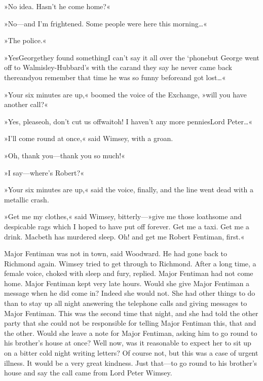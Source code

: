 »No idea. Hasn't he come home?«

»No—and I'm frightened. Some people were here this morning\dots«

»The police.«

»Yes\textellipsis  George\textellipsis  they found something\textellipsis  I can't say it all over the `phone\textellipsis  but George went off to Walmisley-Hubbard's with the car\textellipsis  and they say he never came back there\textellipsis  and\textellipsis  you remember that time he was so funny before\textellipsis  and got lost\dots«

»Your six minutes are up,« boomed the voice of the Exchange, »will you have another call?«

»Yes, please\textellipsis  oh, don't cut us off\textellipsis  wait\textellipsis  oh! I haven't any more pennies\textellipsis  Lord Peter\dots«

»I'll come round at once,« said Wimsey, with a groan.

»Oh, thank you—thank you so much!«

»I say—where's Robert?«

»Your six minutes are up,« said the voice, finally, and the line went dead with a metallic crash.

»Get me my clothes,« said Wimsey, bitterly—»give me those loathsome and despicable rags which I hoped to have put off forever. Get me a taxi. Get me a drink. Macbeth has murdered sleep. Oh! and get me Robert Fentiman, first.«

Major Fentiman was not in town, said Woodward. He had gone back to Richmond again. Wimsey tried to get through to Richmond. After a long time, a female voice, choked with sleep and fury, replied. Major Fentiman had not come home. Major Fentiman kept very late hours. Would she give Major Fentiman a message when he did come in? Indeed she would not. She had other things to do than to stay up all night answering the telephone calls and giving messages to Major Fentiman. This was the second time that night, and she had told the other party that she could not be responsible for telling Major Fentiman this, that and the other. Would she leave a note for Major Fentiman, asking him to go round to his brother's house at once? Well now, was it reasonable to expect her to sit up on a bitter cold night writing letters? Of course not, but this was a case of urgent illness. It would be a very great kindness. Just that—to go round to his brother's house and say the call came from Lord Peter Wimsey.

